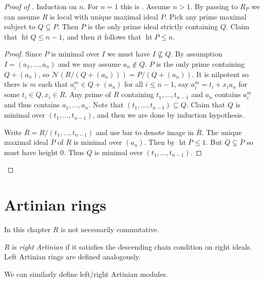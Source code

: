 \documentclass[a4paper]{article}
\newcommand{\nilrad}[1]{\mathcal{N}({#1})} %
\DeclareMathOperator{\htt}{ht} %
\begin{document}
\begin{proof}[Proof of ]
  Induction on \(n\). For \(n = 1\) this is . Assume \(n > 1\). By passing to \(R_P\) we can assume \(R\) is local with unique maximal ideal \(P\). Pick any prime maximal subject to \(Q \subsetneq P\). Then \(P\) is the only prime ideal strictly containing \(Q\). Claim that \(\htt Q \leq n - 1\), and then it follows that \(\htt P \leq n\).

  \begin{proof}
    Since \(P\) is minimal over \(I\) we must have \(I \nsubseteq Q\). By assumption \(I = (a_1, \dots, a_n)\) and we may assume \(a_n \notin Q\). \(P\) is the only prime containing \(Q + (a_n)\), so \(\nilrad{R/(Q + (a_n))} = P/(Q + (a_n))\). It is nilpotent so there is \(m\) such that \(a_i^m \in Q + (a_n)\) for all \(i \leq n - 1\), say \(a_i^m = t_i + x_i a_n\) for some \(t_i \in Q, x_i \in R\). Any prime of \(R\) containing \(t_1, \dots, t_{n - 1}\) and \(a_n\) contains \(a_i^m\) and thus contains \(a_1, \dots, a_n\). Note that \((t_1, \dots, t_{n - 1}) \subseteq Q\). Claim that \(Q\) is minimal over \((t_1, \dots, t_{n - 1})\), and then we are done by induction hypothesis.

    Write \(\overline R = R/(t_1, \dots, t_{n - 1})\) and use bar to denote image in \(\overline R\). The unique maximal ideal \(\overline P\) of \(\overline R\) is minimal over \(\overline{(a_n)}\). Then by  \(\htt \overline P \leq 1\). But \(\overline Q \subsetneq \overline P\) so must have height \(0\). Thus \(Q\) is minimal over \((t_1, \dots, t_{n - 1})\).
  \end{proof}
\end{proof}

\section{Artinian rings}

In this chapter \(R\) is not necessarily commutative.

\begin{definition}
  \(R\) is \emph{right Artinian} if it satisfies the descending chain condition on right ideals. Left Artinian rings are defined analogously.
\end{definition}

We can similarly define left/right Artinian modules.
\end{document}
